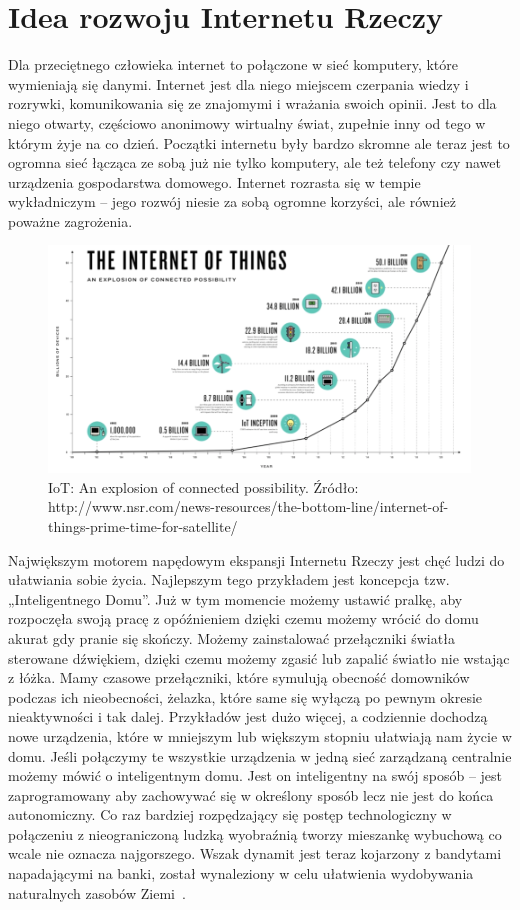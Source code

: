 \documentclass[brudnopis]{xmgr}
\begin{document}
\section{Idea rozwoju Internetu Rzeczy}
Dla przeciętnego człowieka internet to połączone w sieć komputery, które wymieniają się danymi. Internet jest dla niego miejscem czerpania wiedzy i rozrywki, komunikowania się ze znajomymi i wrażania swoich opinii. Jest to dla niego otwarty, częściowo anonimowy wirtualny świat, zupełnie inny od tego w którym żyje na co dzień. Początki internetu były bardzo skromne ale teraz jest to ogromna sieć łącząca ze sobą już nie tylko komputery, ale też telefony czy nawet urządzenia gospodarstwa domowego. Internet rozrasta się w tempie wykładniczym – jego rozwój niesie za sobą ogromne korzyści, ale również poważne zagrożenia.~\cite{Nsr:2015:CMC}
\begin{figure}[h]
\centering
\includegraphics[width=12cm]{m_exp}
\caption{IoT: An explosion of connected possibility. Źródło: http://www.nsr.com/news-resources/the-bottom-line/internet-of-things-prime-time-for-satellite/}
\label{fig:exp}
\end{figure} 
Największym motorem napędowym ekspansji Internetu Rzeczy jest chęć ludzi do ułatwiania sobie życia. Najlepszym tego przykładem jest koncepcja tzw. „Inteligentnego Domu”. Już w tym momencie możemy ustawić pralkę, aby rozpoczęła swoją pracę z opóźnieniem dzięki czemu możemy wrócić do domu akurat gdy pranie się skończy. Możemy zainstalować przełączniki światła sterowane dźwiękiem, dzięki czemu możemy zgasić lub zapalić światło nie wstając z łóżka. Mamy czasowe przełączniki, które symulują obecność domowników podczas ich nieobecności, żelazka, które same się wyłączą po pewnym okresie nieaktywności i tak dalej. Przykładów jest dużo więcej, a codziennie dochodzą nowe urządzenia, które w mniejszym lub większym stopniu ułatwiają nam życie w domu. Jeśli połączymy te wszystkie urządzenia w jedną sieć zarządzaną centralnie możemy mówić o inteligentnym domu. Jest on inteligentny na swój sposób – jest zaprogramowany aby zachowywać się w określony sposób lecz nie jest do końca autonomiczny. Co raz bardziej rozpędzający się postęp technologiczny w połączeniu z nieograniczoną ludzką wyobraźnią tworzy mieszankę wybuchową co wcale nie oznacza najgorszego. Wszak dynamit jest teraz kojarzony z bandytami napadającymi na banki, został wynaleziony w celu ułatwienia wydobywania naturalnych zasobów Ziemi~\cite{Rethinking}.
\end{document}
